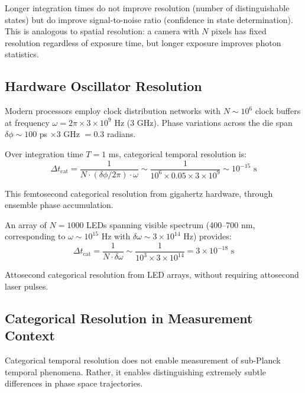 Longer integration times do not improve resolution (number of distinguishable states) but do improve signal-to-noise ratio (confidence in state determination). This is analogous to spatial resolution: a camera with $N$ pixels has fixed resolution regardless of exposure time, but longer exposure improves photon statistics.

\subsection{Hardware Oscillator Resolution}

\begin{example}
\label{ex:cpu_clock}
Modern processors employ clock distribution networks with $N \sim 10^6$ clock buffers at frequency $\omega = 2\pi \times 3 \times 10^9$ Hz (3 GHz). Phase variations across the die span $\delta\phi \sim 100$ ps $\times 3$ GHz $= 0.3$ radians.

Over integration time $T = 1$ ms, categorical temporal resolution is:
\begin{equation}
\Delta t_{\text{cat}} = \frac{1}{N \cdot (\delta\phi/2\pi) \cdot \omega} \sim \frac{1}{10^6 \times 0.05 \times 3 \times 10^9} \sim 10^{-15} \text{ s}
\end{equation}

This femtosecond categorical resolution from gigahertz hardware, through ensemble phase accumulation.
\end{example}

\begin{example}
\label{ex:led_array}
An array of $N = 1000$ LEDs spanning visible spectrum (400--700 nm, corresponding to $\omega \sim 10^{15}$ Hz with $\delta\omega \sim 3 \times 10^{14}$ Hz) provides:
\begin{equation}
\Delta t_{\text{cat}} = \frac{1}{N \cdot \delta\omega} \sim \frac{1}{10^3 \times 3 \times 10^{14}} = 3 \times 10^{-18} \text{ s}
\end{equation}

Attosecond categorical resolution from LED arrays, without requiring attosecond laser pulses.
\end{example}

\subsection{Categorical Resolution in Measurement Context}

Categorical temporal resolution does not enable measurement of sub-Planck temporal phenomena. Rather, it enables distinguishing extremely subtle differences in phase space trajectories.

